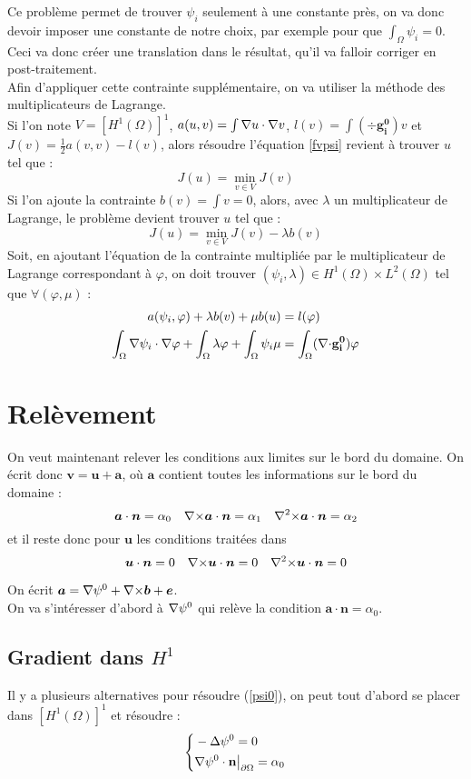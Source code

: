 Ce problème permet de trouver $\psi_i$ seulement à une constante près, on va donc devoir imposer une constante de notre choix, par exemple pour que $\int_\Omega \psi_i = 0$. Ceci va donc créer une translation dans le résultat, qu'il va falloir corriger en post-traitement.\\
Afin d'appliquer cette contrainte supplémentaire, on va utiliser la méthode des multiplicateurs de Lagrange.\\
Si l'on note $V=[H^1(\Omega)]^1$, $a(u,v)=\int {\nabla} u \cdot {\nabla} v$, $l(v)=\int (\div \mathbf{g_i^0})v$ et $J(v)=\frac{1}{2}a(v,v)-l(v)$, alors résoudre l'équation \ref{fvpsi} revient à trouver $u$ tel que :
\[ J(u) = \min_{v\in V} J(v) \]
Si l'on ajoute la contrainte $b(v) = \int v = 0$, alors, avec $\lambda$ un multiplicateur de Lagrange, le problème devient trouver $u$ tel que :
\[ J(u) = \min_{v\in V} J(v) - \lambda b(v) \]
Soit, en ajoutant l'équation de la contrainte multipliée par le multiplicateur de Lagrange correspondant à $\varphi$, on doit trouver $(\psi_i,\lambda)\in H^1(\Omega)\times L^2(\Omega)$ tel que $\forall (\varphi,\mu)$ :
\begin{align}\label{fvpsiml}
a(\psi_i,\varphi) + \lambda b(v) + \mu b(u) &= l(\varphi) \notag \\
\int_\Omega {\nabla}\psi_i\cdot{\nabla}\varphi + \int_\Omega \lambda\varphi + \int_\Omega \psi_i\mu &= \int_\Omega ({\nabla\cdot} \mathbf{g_i^0})\varphi
\end{align}
\fi
\section{Relèvement}
\label{relev}
On veut maintenant relever les conditions aux limites sur le bord du domaine. On écrit donc $\bm{v}=\bm{u}+\bm{a}$, où $\bm{a}$ contient toutes les informations sur le bord du domaine :
\[ \bm{a}\cdot\bm{n}=\alpha_0\quad {\nabla\times}\bm{a}\cdot\bm{n}=\alpha_1\quad {\nabla^2\times}\bm{a}\cdot\bm{n}=\alpha_2 \]
et il reste donc pour $\bm{u}$ les conditions traitées dans \cite{Penel2004}
\[ \bm{u}\cdot\bm{n}=0\quad {\nabla\times}\bm{u}\cdot\bm{n}=0\quad {\nabla^2\times}\bm{u}\cdot\bm{n}=0 \]

On écrit $\bm{a}={\nabla}\psi^0 + {\nabla\times}\bm{b} + \bm{e}$.\\
On va s'intéresser d'abord à ${\nabla}\psi^0$ qui relève la condition $\bm{a}\cdot\bm{n}=\alpha_0$.\\

\subsection{Gradient dans $H^1$}
\label{secpsi0hdiv} \label{multLagrange}
Il y a plusieurs alternatives pour résoudre (\ref{psi0}), on peut tout d'abord se placer dans $[H^1(\Omega)]^1$ et résoudre :
\begin{equation}\label{pbpsi0}
\left\{\begin{aligned}
&-{\Delta}\psi^0 = 0\\
&{\nabla}\psi^0\cdot \mathbf{n}{\big\rvert_{\partial\Omega}}=\alpha_0
\end{aligned}\right.
\end{equation}

